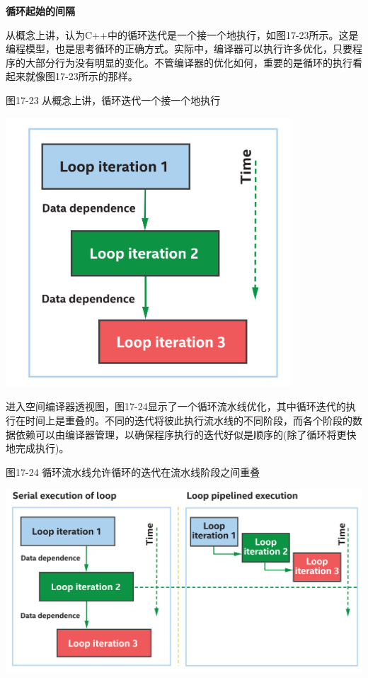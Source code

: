 \hspace*{\fill} \par %
\textbf{循环起始的间隔}

从概念上讲，认为C++中的循环迭代是一个接一个地执行，如图17-23所示。这是编程模型，也是思考循环的正确方式。实际中，编译器可以执行许多优化，只要程序的大部分行为没有明显的变化。不管编译器的优化如何，重要的是循环的执行看起来就像图17-23所示的那样。\par

\hspace*{\fill} \par %
图17-23 从概念上讲，循环迭代一个接一个地执行
\begin{center}
	\includegraphics[width=0.8\textwidth]{content/chapter-17/images/18}
\end{center}

进入空间编译器透视图，图17-24显示了一个循环流水线优化，其中循环迭代的执行在时间上是重叠的。不同的迭代将彼此执行流水线的不同阶段，而各个阶段的数据依赖可以由编译器管理，以确保程序执行的迭代好似是顺序的(除了循环将更快地完成执行)。\par

\hspace*{\fill} \par %
图17-24 循环流水线允许循环的迭代在流水线阶段之间重叠
\begin{center}
	\includegraphics[width=1.0\textwidth]{content/chapter-17/images/19}
\end{center}

